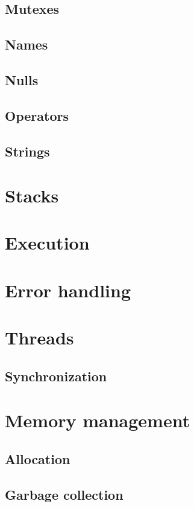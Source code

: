 \subsection{Mutexes}
\subsection{Names}
\subsection{Nulls}
\subsection{Operators}
\subsection{Strings}

\section{Stacks}

\section{Execution}

\section{Error handling}

\section{Threads}
\subsection{Synchronization}

\section{Memory management}
\subsection{Allocation}
\subsection{Garbage collection}

